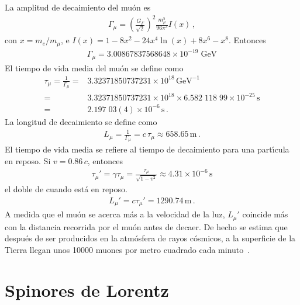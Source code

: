 \begin{frame}
\begin{example}
  La amplitud de decaimiento del mu\'on es
    \begin{align}
      \Gamma_\mu=\left(\frac{G_F}{\sqrt{2}}\right)^2\frac{m_\mu^5}{96\pi^3}I\left(x\right)\,,
    \end{align}
    con $x=m_e/m_\mu$, e $I(x)=1-8x^2-24x^4\ln(x)+8x^6-x^8$.
    Entonces
    \begin{align}
      \Gamma_\mu=3.00867837568648 \times 10^{- 19} \; \text{GeV}
    \end{align}
    El tiempo de vida media del mu\'on se define como
    \begin{align}
      \tau_\mu=\frac{1}{\Gamma_\mu}=&3.32371850737231\times10^{18}\,\text{GeV}^{-1}\nonumber\\
      =&3.32371850737231\times10^{18}\times6.582\;118\;99\times10^{-25}\,\text{s}\nonumber\\
      =&2.197\;03(4)\times10^{-6}\,\text{s}\,.
    \end{align}
La longitud de decaimiento se define como
\begin{align}
  L_\mu=\frac{1}{\Gamma_\mu}=c\,\tau_\mu\approx658.65\,\text{m}\,.
\end{align}
El tiempo de vida media se refiere al tiempo de decaimiento para una part\'\i cula en reposo. Si $v=0.86\,c$, entonces
\begin{align}
  \tau_\mu'=\gamma\tau_\mu=\frac{\tau_\mu}{\sqrt{1-v^2}}\approx4.31\times10^{-6}\,\text{s}
\end{align}
el doble de cuando est\'a en reposo. 
\begin{align}
  L_\mu'=c\tau_\mu'=1290.74\,\text{m}\,.
\end{align}
A medida que el mu\'on se acerca m\'as a la velocidad de la luz, $L_\mu'$ coincide m\'as con la distancia recorrida por el mu\'on antes de decaer. De hecho se estima que despu\'es de ser producidos en la atm\'osfera de rayos c\'osmicos, a la superficie de la Tierra llegan unos 10000 muones por metro cuadrado cada minuto~\cite{muon}.

\end{example}

\end{frame}

\section{Spinores de Lorentz}



